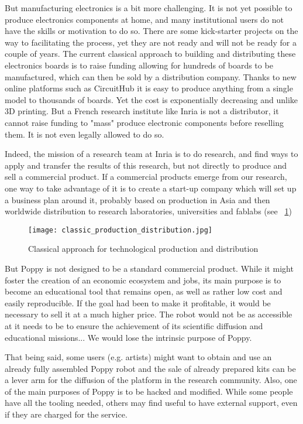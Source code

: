 But manufacturing electronics is a bit more challenging. It is not yet possible to produce electronics components at home, and many institutional users do not have the skills or motivation to do so. There are some kick-starter projects on the way to facilitating the process, yet they are not ready and will not be ready for a couple of years. The current classical approach to building and distributing these electronics boards is to raise funding allowing for hundreds of boards to be manufactured, which can then be sold by a distribution company. Thanks to new online platforms such as CircuitHub it is easy to produce anything from a single model to thousands of boards. Yet the cost is exponentially decreasing and unlike 3D printing. But a French research institute like Inria is not a distributor, it cannot raise funding to "mass" produce electronic components before reselling them. It is not even legally allowed to do so.

Indeed, the mission of a research team at Inria is to do research, and find ways to apply and transfer the results of this research, but not directly to produce and sell a commercial product. If a commercial products emerge from our research, one way to take advantage of it is to create a start-up company which will set up a business plan around it, probably based on production in Asia and then worldwide distribution to research laboratories, universities and fablabs (see \figurename~\ref{fig:classic})

\begin{figure}[tb]
    \begin{center}
        \texttt{[image: classic\_production\_distribution.jpg]}
    \end{center}
    \caption{Classical approach for technological production and distribution}
    \label{fig:classic}
\end{figure}

But Poppy is not designed to be a standard commercial product. While it might foster the creation of an economic ecosystem and jobs, its main purpose is to become an educational tool that remains open, as well as rather low cost and easily reproducible. If the goal had been to make it profitable, it would be necessary to sell it at a much higher price. The robot would not be as accessible at it needs to be to ensure the achievement of its scientific diffusion and educational missions... We would lose the intrinsic purpose of Poppy.

That being said, some users (e.g. artists) might want to obtain and use an already fully assembled Poppy robot and the sale of already prepared kits can be a lever arm for the diffusion of the platform in the research community.
Also, one of the main purposes of Poppy is to be hacked and modified.  While some people have all the tooling needed, others may find useful to have external support, even if they are charged for the service.

